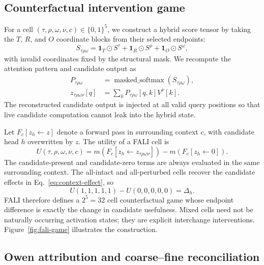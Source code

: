 \subsection{Counterfactual intervention game}\label{sec:game}

For a cell $(\tau,\rho,\omega,\nu,c)\in\{0,1\}^{5}$, we construct a hybrid score tensor by taking the $T$, $R$, and $O$ coordinate blocks from their selected endpoints:
\begin{equation}
S_{\tau\rho\omega}=
\mathbf{1}_{T}\odot S^{\tau}+
\mathbf{1}_{R}\odot S^{\rho}+
\mathbf{1}_{O}\odot S^{\omega},
\label{eq:hybrid-scores}
\end{equation}
with invalid coordinates fixed by the structural mask. We recompute the attention pattern and candidate output as
\begin{align}
P_{\tau\rho\omega}&=\operatorname{masked\_softmax}(S_{\tau\rho\omega}),\\
z_{\tau\rho\omega\nu}[q]&=\sum_k P_{\tau\rho\omega}[q,k]V^{\nu}[k].
\label{eq:hybrid-z}
\end{align}
The reconstructed candidate output is injected at all valid query positions so that live candidate computation cannot leak into the hybrid state.

Let $F_c[z_h\leftarrow z]$ denote a forward pass in surrounding context $c$, with candidate head $h$ overwritten by $z$. The utility of a FALI cell is
\begin{equation}
U(\tau,\rho,\omega,\nu,c)
=m\!\left(F_c[z_h\leftarrow z_{\tau\rho\omega\nu}]\right)
-m\!\left(F_c[z_h\leftarrow0]\right).
\label{eq:fali-utility}
\end{equation}
The candidate-present and candidate-zero terms are always evaluated in the same surrounding context. The all-intact and all-perturbed cells recover the candidate effects in Eq.~\ref{eq:context-effect}, so
\begin{equation}
U(1,1,1,1,1)-U(0,0,0,0,0)=\Delta_h.
\label{eq:fali-endpoint-identity}
\end{equation}
FALI therefore defines a $2^5=32$ cell counterfactual game whose endpoint difference is exactly the change in candidate usefulness. Mixed cells need not be naturally occurring activation states; they are explicit interchange interventions. Figure~\ref{fig:fali-game} illustrates the construction.



\subsection{Owen attribution and coarse--fine reconciliation}\label{sec:owen}

